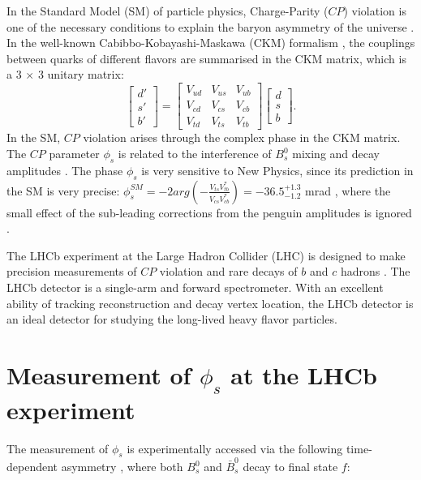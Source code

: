 \documentclass[10pt]{article}
\def\CP                {{\ensuremath{C\!P}}\xspace}
\begin{document}
In the Standard Model (SM) of particle physics, Charge-Parity (\CP) violation is one of the necessary conditions to explain the baryon asymmetry of the universe \cite{Sakharov:1967dj}. In the well-known Cabibbo-Kobayashi-Maskawa (CKM) formalism \cite{Kobayashi:1973fv}, the couplings between quarks of different flavors are summarised in the CKM matrix, which is a 3 $\times$ 3 unitary matrix:
\begin{equation}
\begin{bmatrix}
d' \\
s' \\
b'
\end{bmatrix}
= 
\begin{bmatrix}
     V_{ud} & V_{us} & V_{ub}\\
     V_{cd} & V_{cs} & V_{cb}\\ 
     V_{td} & V_{ts} & V_{tb}
\end{bmatrix}
\begin{bmatrix}
d\\
s\\
b
\end{bmatrix}
.
\end{equation}
In the SM, \CP violation arises through the complex phase in the CKM matrix. The \CP parameter $\phi_s$ is related to the interference of $B_s^0$ mixing and decay amplitudes \cite{Zhang:2012sq}.
The phase $\phi_s$ is very sensitive to New Physics, since its prediction in the SM is very precise: $\phi_s^{SM} = -2 arg(-\frac{V_{ts}V_{tb}^*}{V_{cs} V_{cb}^*}) = -36.5 ^{+1.3}_{-1.2}$ mrad \cite{Charles:2015gya}, where the small effect of the sub-leading corrections from the penguin amplitudes is ignored \cite{Fleischer:2015mla, Aaij:2014vda, Aaij:2015mea}. 

The LHCb experiment at the Large Hadron Collider (LHC) is designed to make precision measurements of \CP violation and rare decays of $b$ and $c$ hadrons \cite{Alves:2008zz}. The LHCb detector is a single-arm and forward spectrometer. With an excellent ability of tracking reconstruction and decay vertex location, the LHCb detector is an ideal detector for studying the long-lived heavy flavor particles.

\section{Measurement of $\phi_s$  at the LHCb experiment}
The measurement of $\phi_s$ is experimentally accessed via the following time-dependent asymmetry \cite{Zhang:2012sq}, where both $B^0_s$ and $\bar{B}^0_s$ decay to final state $f$:
\end{document}

